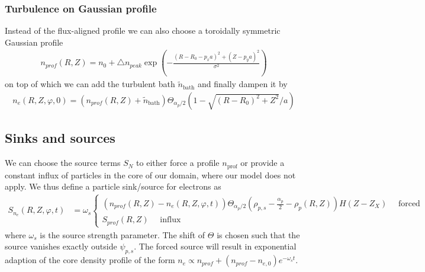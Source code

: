 \subsubsection{Turbulence on Gaussian profile}
Instead of the flux-aligned profile we can also choose a toroidally symmetric Gaussian profile
\begin{align} \label{eq:profile_blob}
  n_{prof}(R,Z) = n_0 + \triangle n_{peak} \exp\left( -\frac{(R - R_0 - p_x a)^2 + (Z-p_ya)^2}{\sigma^2} \right)
\end{align}
on top of which we can add the turbulent bath $\tilde n_{\text{bath}}$ and finally dampen it by
\begin{align}\label{eq:turbulence_on_gaussian}
    n_e(R,Z,\varphi,0) = (n_{prof}(R,Z) + \tilde n_{\text{bath}})\Theta_{\alpha_p/2}\left( 1- \sqrt{(R-R_0)^2 + Z^2}/a\right)
\end{align}

\subsection{Sinks and sources} \label{sec:sources}
We can choose the source terms $S_N$ to either force a profile
$n_{\text{prof}}$ or provide a constant influx of particles in the
core of our domain, where our model does not apply.
We thus define a particle sink/source for electrons as
\begin{align} \label{eq:electron_source}
  S_{n_e}(R,Z,\varphi, t) &= \omega_s \begin{cases}
      (n_{prof}(R,Z) - n_e(R,Z,\varphi, t))\Theta_{\alpha_p/2}\left( \rho_{p,s} - \frac{\alpha_p}{2} - \rho_p(R,Z) \right ) H(Z-Z_X) \quad \text{ forced}\\
    S_{prof}(R,Z)\quad \text{ influx}
    \end{cases}
\end{align}
where $\omega_s$ is the source strength parameter. The shift of $\Theta$ is chosen
such that the source vanishes exactly outside $\psi_{p,s}$.
The forced source will result in exponential adaption of the core
density profile of the form $n_e \propto n_{prof}+(n_{prof}-n_{e,0})e^{-\omega_st}$.

